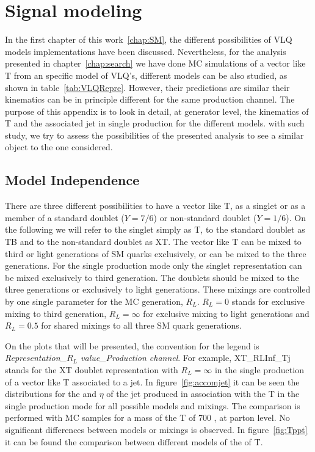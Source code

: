 
\chapter{Signal modeling}
\label{chap:sigmod}

In the first chapter of this work~\ref{chap:SM}, the different possibilities of VLQ models implementations have been discussed. Nevertheless, for the analysis presented in chapter~\ref{chap:search} we have done MC simulations of a vector like T from an specific model of VLQ's, different models can be also studied, as shown in table~\ref{tab:VLQRepre}. However, their predictions are similar their kinematics can be in principle different for the same production channel. The purpose of this appendix is to look in detail, at generator level, the kinematics of T and the associated jet in single production for the different models. with such study, we try to assess the possibilities of the presented analysis to see a similar object to the one considered.

\section{Model Independence}
\label{sec:modindp}

There are three different possibilities to have a vector like T, as a singlet or as a member of a standard doublet ($Y=7/6$) or non-standard doublet ($Y=1/6$). On the following we will refer to the singlet simply as T, to the standard doublet as TB and to the non-standard doublet as XT. The vector like T can be mixed to third or light generations of SM quarks exclusively, or can be mixed to the three generations. For the single production mode only the singlet representation can be mixed exclusively to third generation. The doublets should be mixed to the three generations or exclusively to light generations. These mixings are controlled by one single parameter for the MC generation, $R_{L}$. $R_{L}=0$ stands for exclusive mixing to third generation, $R_{L}=\infty$ for exclusive mixing to light generations and $R_{L}=0.5$ for shared mixings to all three SM quark generations. 

On the plots that will be presented, the convention for the legend is \textit{Representation\_$R_{L}$ value\_Production channel}. For example, XT\_RLInf\_Tj stands for the XT doublet representation with $R_{L}=\infty$ in the single production of a vector like T associated to a jet. In figure~\ref{fig:accomjet} it can be seen the distributions for the \pt and $\eta$ of the jet produced in association with the T in the single production mode for all possible models and mixings. The comparison is performed with MC samples for a mass of the T of 700 \GeVcc, at parton level. No significant differences between models or mixings is observed. In figure~\ref{fig:Tppt} it can be found the comparison between different models of the \pt of T. 

